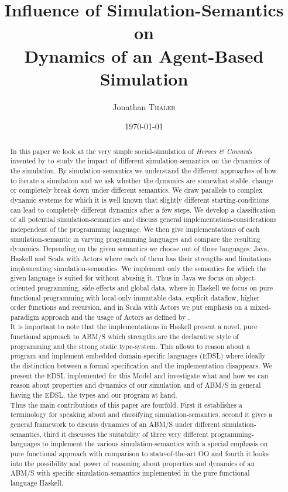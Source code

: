 \documentclass{article}
\title{Influence of Simulation-Semantics on \\ Dynamics of an Agent-Based Simulation} %
\author{Jonathan \textsc{Thaler}} %
\date{\today} %
\begin{document}
\maketitle %

\begin{abstract}
In this paper we look at the very simple social-simulation of \textit{Heroes \& Cowards} invented by \cite{wilensky_introduction_2015} to study the impact of different simulation-semantics on the dynamics of the simulation. By simulation-semantics we understand the different approaches of how to iterate a simulation and we ask whether the dynamics are somewhat stable, change or completely break down under different semantics. We draw parallels to complex dynamic systems for which it is well known that slightly different starting-conditions can lead to completely different dynamics after a few steps. We develop a classification of all potential simulation-semantics and discuss general implementation-considerations independent of the programming language. We then give implementations of each simulation-semantic in varying programming languages and compare the resulting dynamics. Depending on the given semantics we choose out of three languages: Java, Haskell and Scala with Actors where each of them has their strengths and limitations implementing simulation-semantics. We implement only the semantics for which the given language is suited for without abusing it. Thus in Java we focus on object-oriented programming, side-effects and global data, where in Haskell we focus on pure functional programming with local-only immutable data, explicit dataflow, higher order functions and recursion, and in Scala with Actors we put emphasis on a mixed-paradigm approach and the usage of Actors as defined by \cite{agha_actors:_1986}. \\
It is important to note that the implementations in Haskell present a novel, pure functional approach to ABM/S which strengths are the declarative style of programming and the strong static type-system. This allows to reason about a program and implement embedded domain-specific languages (EDSL) where ideally the distinction between a formal specification and the implementation disappears. We present the EDSL implemented for this Model and investigate what and how we can reason about properties and dynamics of our simulation and of ABM/S in general having the EDSL, the types and our program at hand. \\
Thus the main contributions of this paper are fourfold. First it establishes a terminology for speaking about and classifying simulation-semantics, second it gives a general framework to discuss dynamics of an ABM/S under different simulation-semantics, third it discusses the suitability of three very different programming-languages to implement the various simulation-semantics with a special emphasis on pure functional approach with comparison to state-of-the-art OO and fourth it looks into the possibility and power of reasoning about properties and dynamics of an ABM/S with specific simulation-semantics implemented in the pure functional language Haskell.
\end{abstract}
\end{document}
